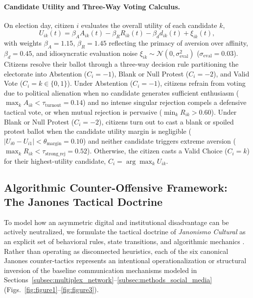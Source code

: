 \documentclass{article}
\begin{document}
\paragraph{Candidate Utility and Three-Way Voting Calculus.}
On election day, citizen $i$ evaluates the overall utility of each candidate $k$,
\begin{equation}
    U_{ik}(t) = \beta_A A_{ik}(t) - \beta_R R_{ik}(t) - \beta_d d_{ik}(t) + \xi_{ik}(t),
    \label{eq:candidate_utility}
\end{equation}
with weights $\beta_A = 1.15$, $\beta_R = 1.45$ reflecting the primacy of aversion over affinity, $\beta_d = 0.45$, and idiosyncratic evaluation noise $\xi_{ik} \sim \mathcal{N}(0, \sigma_{\mathrm{eval}}^2)$ ($\sigma_{\mathrm{eval}} = 0.03$). Citizens resolve their ballot through a three-way decision rule partitioning the electorate into Abstention ($C_i = -1$), Blank or Null Protest ($C_i = -2$), and Valid Vote ($C_i = k \in \{0, 1\}$). Under Abstention ($C_i = -1$), citizens refrain from voting due to political alienation when no candidate generates sufficient enthusiasm ($\max_k A_{ik} < \tau_{\mathrm{turnout}} = 0.14$) and no intense singular rejection compels a defensive tactical vote, or when mutual rejection is pervasive ($\min_k R_{ik} > 0.60$). Under Blank or Null Protest ($C_i = -2$), citizens turn out to cast a blank or spoiled protest ballot when the candidate utility margin is negligible ($|U_{i0} - U_{i1}| < \theta_{\mathrm{margin}} = 0.10$) and neither candidate triggers extreme aversion ($\max_k R_{ik} < \tau_{\mathrm{strong\_rej}} = 0.52$). Otherwise, the citizen casts a Valid Choice ($C_i = k$) for their highest-utility candidate, $C_i = \arg\max_k U_{ik}$.

\subsection{Algorithmic Counter-Offensive Framework: The Janones Tactical Doctrine}
\label{subsec:janones_tactical_doctrine}

To model how an asymmetric digital and institutional disadvantage can be actively neutralized, we formulate the tactical doctrine of \emph{Janonismo Cultural} as an explicit set of behavioral rules, state transitions, and algorithmic mechanics \citep{janones2023janonismo}. Rather than operating as disconnected heuristics, each of the six canonical Janones counter-tactics represents an intentional operationalization or structural inversion of the baseline communication mechanisms modeled in Sections~\ref{subsec:multiplex_network}--\ref{subsec:methods_social_media} (Figs.~\ref{fig:figure1}--\ref{fig:figure3}).
\end{document}
